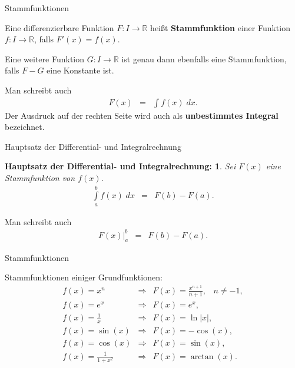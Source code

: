 \documentclass[german]{beamer}
\newcommand{\bq}{\begin{eqnarray*}}
\newcommand{\eq}{\end{eqnarray*}}
\newtheorem*{mytheorem27}{Hauptsatz der Differential- und Integralrechnung:}
\begin{document}
\begin{frame}{Stammfunktionen}

\begin{definition}
Eine differenzierbare Funktion $F : I \rightarrow \mathbb R$ hei{\ss}t {\bf Stammfunktion} einer
Funktion $f : I \rightarrow \mathbb R$, falls $F'(x)=f(x)$.
\end{definition}

Eine weitere Funktion $G : I \rightarrow \mathbb R$ ist genau dann ebenfalls eine Stammfunktion, falls
$F-G$ eine Konstante ist.

\vspace*{4mm}
Man schreibt auch
\bq
 F(x) & = & \int f(x)\; dx.
\eq
Der Ausdruck auf der rechten Seite wird auch als {\bf unbestimmtes Integral} bezeichnet.

\end{frame}

\begin{frame}{Hauptsatz der Differential- und Integralrechnung}

\begin{mytheorem27}
Sei $F(x)$ eine Stammfunktion von $f(x)$.
\bq
 \int\limits_a^b f(x) \; dx & = & F(b) - F(a).
\eq
\end{mytheorem27}

Man schreibt auch
\bq
 \left. F(x) \right|_a^b & = & F(b) - F(a).
\eq

\end{frame}

\begin{frame}{Stammfunktionen}

Stammfunktionen einiger Grundfunktionen:
\bq
 f(x) = x^n & \Rightarrow & F(x) = \frac{x^{n+1}}{n+1}, \;\;\; n \neq -1,
 \nonumber \\
 f(x) = e^x & \Rightarrow & F(x) = e^x, 
 \nonumber \\
 f(x) = \frac{1}{x} & \Rightarrow & F(x) = \ln\left| x \right|,
 \nonumber \\
 f(x) = \sin(x) & \Rightarrow & F(x) = -\cos(x),
 \nonumber \\
 f(x) = \cos(x) & \Rightarrow & F(x) = \sin(x),
 \nonumber \\
 f(x) = \frac{1}{1+x^2} & \Rightarrow & F(x) = \arctan(x).
\eq

\end{frame}
\end{document}
